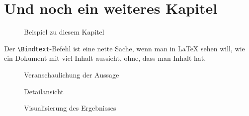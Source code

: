 

\chapter{Und noch ein weiteres Kapitel}

\begin{figure}[p]
  \centering
  \caption{Beispiel zu diesem Kapitel}
  \label{example}
\end{figure}

\Blindtext Der \verb$\Bindtext$-Befehl ist eine nette Sache, wenn man in \LaTeX{} sehen will, wie ein Dokument mit viel Inhalt aussieht, ohne, dass man Inhalt hat.

\begin{figure}[p]
  \centering
  \caption{Veranschaulichung der Aussage}
  \label{illustration}
\end{figure}

\begin{figure}[p]
  \centering
  \caption{Detailansicht}
  \label{detail}
\end{figure}

\begin{figure}[p]
  \centering
  \caption{Visualisierung des Ergebnisses}
  \label{visualization}
\end{figure}